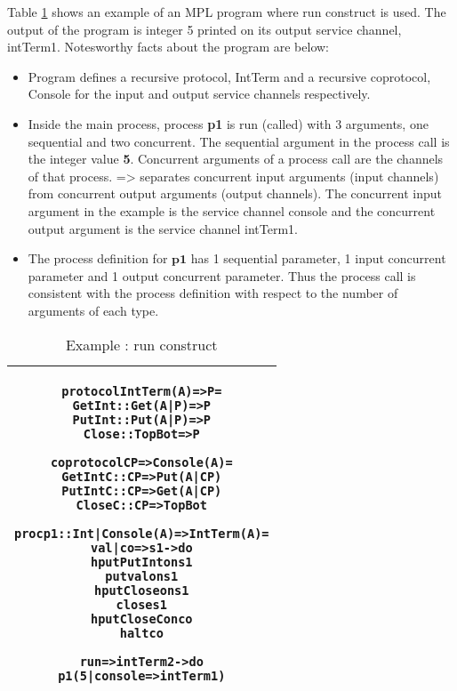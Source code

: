 \documentclass[11pt]{article}
\newcommand{\<}{\langle}
\renewcommand{\>}{\rangle}
\begin{document}
Table \ref {Conc : runExample} shows an example of an MPL program where {\sf run} construct is used. The output of the program is integer 5 printed on its output service channel, intTerm1. Notesworthy facts about the program are below:

\begin{itemize}
  \item Program defines a recursive protocol, IntTerm and a recursive coprotocol, Console for the input and output service channels respectively.

  \item Inside the main process, process {\bf p1} is {\sf run} (called) with 3 arguments, one sequential and two concurrent. The sequential argument in the process call is the integer value {\bf 5}. Concurrent arguments of a process call are the channels of that process. $\texttt{=>}$ separates concurrent input arguments (input channels) from concurrent output arguments (output channels). The concurrent input argument in the example is the service channel console and the concurrent output argument is the service channel intTerm1. 
  \item The process definition for $\mathbf{p1}$ has 1 sequential parameter, 1 input concurrent parameter and 1 output concurrent parameter. Thus the process call is consistent with the process definition with respect to the number of arguments of each type. 
\end{itemize}
\begin{table}
\begin{center}
\begin{tabular}{|c|} \hline
\begin{minipage}{5in}
{
\begin{alltt}


    protocol IntTerm (A) => P =
        GetInt    :: Get (A|P) => P 
        PutInt    :: Put (A|P) => P
        Close     :: TopBot    => P  

    coprotocol CP => Console (A) =
        GetIntC   :: CP => Put (A|CP)  
        PutIntC   :: CP => Get (A|CP) 
        CloseC    :: CP => TopBot 

    proc p1 :: Int | Console (A) => IntTerm (A) = 
        val | co => s1 -> do 
            hput PutInt on s1 
            put val on s1
            hput Close on s1 
            close s1
            hput CloseC on co
            halt co

    run => intTerm2 -> do 
          p1 ( 5 | console => intTerm1 )

\end{alltt}

} 
\end {minipage} 
\tabularnewline
\hline
\end{tabular}
\caption{Example : {\sf run} construct}
\label{Conc : runExample}
\end{center}
\end{table}
\end{document}
